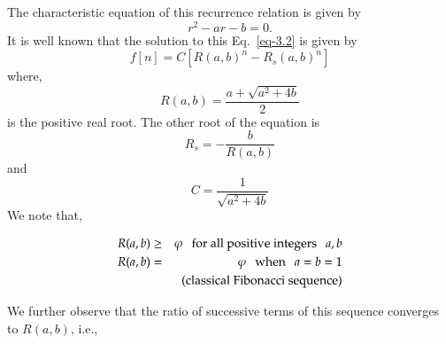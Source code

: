 \begin{multicols}{2}
The characteristic equation of this recurrence relation is given by
\begin{equation}
r^2 - ar - b = 0.\label{eq-3.2}
\end{equation}
It is well known that the solution to this Eq.~\eqref{eq-3.2} is given by
\begin{equation*}
f[n] =  C[R(a,b)^n - R_s(a,b)^n]
\end{equation*}
where, 
\begin{equation*}
R(a,b) = \displaystyle{\frac{a +\sqrt{a^2 + 4b}}{2}}
\end{equation*}
is the positive real root. The other root of the equation is 
\begin{equation*}
R_s = - \frac{b}{R(a,b)}
\end{equation*}
and 
\begin{equation*}
C = \displaystyle{\frac{1}{\sqrt{a^2 + 4b}}}
\end{equation*}
We note that,

\begin{eqnarray}
R(a,b) &\geq& \varphi \hspace{0.1in} \textup{for all positive integers} \hspace{0.1in} a, b\\\label{eq-3.3}
R(a,b) &=& \varphi   \hspace{0.1in}\textup{when}\hspace{0.1in} a = b = 1\\\label{eq-3.4}
       & &\textup{(classical Fibonacci sequence)}\nonumber
\end{eqnarray}


\vspace{-.6cm}


We further observe that the ratio of successive terms of this sequence converges to $R(a,b)$, i.e.,


\end{multicols}
